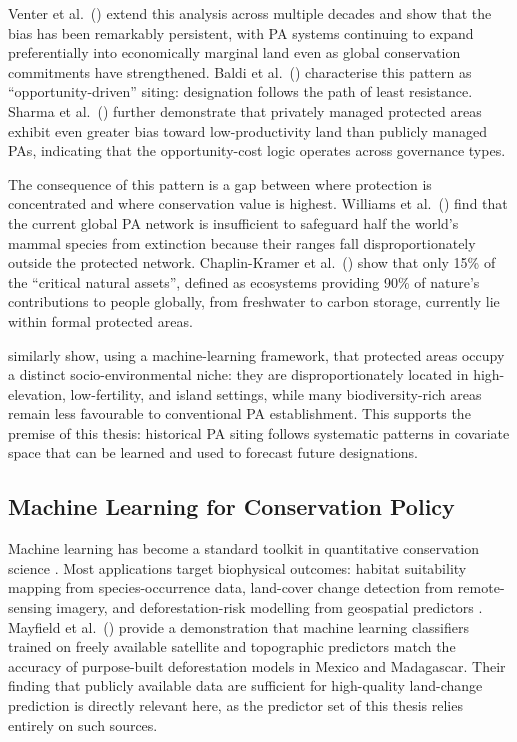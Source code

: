 \documentclass[12pt]{article}
\theoremstyle{break}
\begin{document}
Venter et al.\ (\citeyear{venter2018}) extend this analysis across multiple decades and
show that the bias has been remarkably persistent, with PA systems continuing to expand
preferentially into economically marginal land even as global conservation commitments
have strengthened. Baldi et al.\ (\citeyear{baldi2017}) characterise this pattern as
``opportunity-driven'' siting: designation follows the path of least resistance. Sharma
et al.\ (\citeyear{sharma2025}) further demonstrate that privately managed protected
areas exhibit even greater bias toward low-productivity land than publicly managed PAs, indicating
that the opportunity-cost logic operates across governance types.

The consequence of this pattern is a gap between where protection
is concentrated and where conservation value is highest. Williams et al.\
(\citeyear{williams2022}) find that the current global PA network is insufficient to
safeguard half the world's mammal species from extinction because their ranges fall
disproportionately outside the protected network. Chaplin-Kramer et al.\
(\citeyear{chaplin2023}) show that only 15\% of the ``critical natural assets'', defined as 
ecosystems providing 90\% of nature's contributions to people globally, from freshwater
to carbon storage, currently lie within formal protected areas.

\citet{mouillot2024} similarly show, using a machine-learning framework, that protected
areas occupy a distinct socio-environmental niche: they are disproportionately located in
high-elevation, low-fertility, and island settings, while many biodiversity-rich areas remain
less favourable to conventional PA establishment. This supports the premise of this thesis:
historical PA siting follows systematic patterns in covariate space that can be learned and
used to forecast future designations.

\subsection{Machine Learning for Conservation Policy}
\label{sec:lit_ml}

Machine learning has become a standard toolkit in quantitative conservation science 
\citep{pichler2023}. Most applications target biophysical outcomes: habitat suitability
mapping from species-occurrence data, land-cover change detection from remote-sensing 
imagery, and deforestation-risk modelling from geospatial predictors \citep{ball2022, pichler2023}.
Mayfield et al.\ (\citeyear{mayfield2017}) provide a demonstration that machine learning
classifiers trained on freely available satellite and topographic
predictors match the accuracy of purpose-built deforestation models in Mexico and
Madagascar. Their finding that publicly available data are sufficient for high-quality
land-change prediction is directly relevant here, as the predictor set of this thesis relies entirely on such sources.
\end{document}
